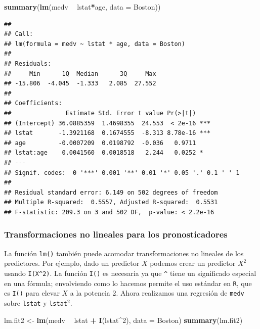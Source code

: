 \documentclass[]{book}
\newenvironment{Shaded}{\begin{snugshade}}{\end{snugshade}}
\newcommand{\KeywordTok}[1]{\textcolor[rgb]{0.13,0.29,0.53}{\textbf{#1}}}
\newcommand{\DataTypeTok}[1]{\textcolor[rgb]{0.13,0.29,0.53}{#1}}
\newcommand{\DecValTok}[1]{\textcolor[rgb]{0.00,0.00,0.81}{#1}}
\newcommand{\StringTok}[1]{\textcolor[rgb]{0.31,0.60,0.02}{#1}}
\newcommand{\OperatorTok}[1]{\textcolor[rgb]{0.81,0.36,0.00}{\textbf{#1}}}
\newcommand{\NormalTok}[1]{#1}
\begin{document}
\begin{Shaded}
\begin{Highlighting}[]
\KeywordTok{summary}\NormalTok{(}\KeywordTok{lm}\NormalTok{(medv }\OperatorTok{~}\StringTok{ }\NormalTok{lstat}\OperatorTok{*}\NormalTok{age, }\DataTypeTok{data =}\NormalTok{ Boston))}
\end{Highlighting}
\end{Shaded}

\begin{verbatim}
## 
## Call:
## lm(formula = medv ~ lstat * age, data = Boston)
## 
## Residuals:
##     Min      1Q  Median      3Q     Max 
## -15.806  -4.045  -1.333   2.085  27.552 
## 
## Coefficients:
##               Estimate Std. Error t value Pr(>|t|)    
## (Intercept) 36.0885359  1.4698355  24.553  < 2e-16 ***
## lstat       -1.3921168  0.1674555  -8.313 8.78e-16 ***
## age         -0.0007209  0.0198792  -0.036   0.9711    
## lstat:age    0.0041560  0.0018518   2.244   0.0252 *  
## ---
## Signif. codes:  0 '***' 0.001 '**' 0.01 '*' 0.05 '.' 0.1 ' ' 1
## 
## Residual standard error: 6.149 on 502 degrees of freedom
## Multiple R-squared:  0.5557, Adjusted R-squared:  0.5531 
## F-statistic: 209.3 on 3 and 502 DF,  p-value: < 2.2e-16
\end{verbatim}

\subsubsection{Transformaciones no lineales para los
pronosticadores}\label{transformaciones-no-lineales-para-los-pronosticadores}

La función \texttt{lm()} también puede acomodar transformaciones no
lineales de los predictores. Por ejemplo, dado un predictor \(X\)
podemos crear un predictor \(X^2\) usando \texttt{I(X\^{}2)}. La función
\texttt{I()} es necesaria ya que \texttt{\^{}} tiene un significado
especial en una fórmula; envolviendo como lo hacemos permite el uso
estándar en \texttt{R}, que es \texttt{I()} para elevar \(X\) a la
potencia 2. Ahora realizamos una regresión de \texttt{medv} sobre
\texttt{lstat} y \texttt{lstat}\(^2\).

\begin{Shaded}
\begin{Highlighting}[]
\NormalTok{lm.fit2 <-}\StringTok{ }\KeywordTok{lm}\NormalTok{(medv }\OperatorTok{~}\StringTok{ }\NormalTok{lstat }\OperatorTok{+}\StringTok{ }\KeywordTok{I}\NormalTok{(lstat}\OperatorTok{^}\DecValTok{2}\NormalTok{), }\DataTypeTok{data =}\NormalTok{ Boston)}
\KeywordTok{summary}\NormalTok{(lm.fit2)}
\end{Highlighting}
\end{Shaded}
\end{document}

